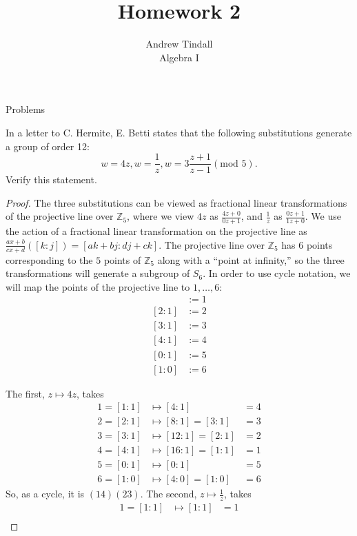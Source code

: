 \documentclass[12pt]{article}
\newcommand{\Z}{\mathbb{Z}}
\theoremstyle{definition}
\newenvironment{problem}[2][Problem]{\begin{trivlist}
\item[\hskip \labelsep {\bfseries #1}\hskip \labelsep {\bfseries #2.}]}{\end{trivlist}}
\begin{document}
 
 
\title{Homework 2}
\author{Andrew Tindall\\
Algebra I}
 
\maketitle
\begin{section}{Problems}
\begin{problem}{1}
	In a letter to C. Hermite, E. Betti states that the following substitutions generate a group of order 12:
	\[ w = 4z, w = \frac{1}{z}, w = 3\frac{z + 1}{z - 1} (\text{mod }5).\]
	Verify this statement. 
	\begin{proof}
		The three substitutions can be viewed as fractional linear transformations of the projective line over $\Z_5$, where we view $4z$ as $\frac{4z + 0}{0z + 1}$, and $\frac{1}{z}$ as $\frac{0z + 1}{1z + 0}$. We use the action of a fractional linear transformation on the projective line as $\frac{ax + b}{cx + d}([k:j]) = [ak+bj:dj+ ck]$. The projective line over $\Z_5$ has $6$ points corresponding to the $5$ points of $\Z_5$ along with a ``point at infinity,'' so the three transformations will generate a subgroup of $S_6$. In order to use cycle notation, we will map the points of the projective line to $1, \dots , 6$:
		\begin{align*}
			[1:1] &:= 1\\
			[2:1] &:= 2\\
			[3:1] &:= 3\\
			[4:1] &:= 4\\
			[0:1] &:= 5\\
			[1:0] &:= 6
		\end{align*}
		\par The first, $z \mapsto 4z$, takes 
		\begin{align*}
			1 = [1:1] &\mapsto [4:1] &= 4\\
			2 = [2:1] &\mapsto [8:1] = [3:1] &= 3\\
			3 = [3:1] &\mapsto [12:1] = [2:1] &= 2\\
			4 = [4:1] &\mapsto [16:1] = [1:1] &=1\\
			5 = [0:1] &\mapsto [0:1] & = 5\\
			6 = [1:0] &\mapsto [4:0] = [1:0]&= 6
		\end{align*}
		So, as a cycle, it is $(14)(23)$. The second, $z \mapsto \frac{1}{z}$, takes
		\begin{align*}
			1 = [1:1] &\mapsto [1:1] &= 1\\

\end{align*}
\end{proof}
\end{problem}
\end{section}
\end{document}
